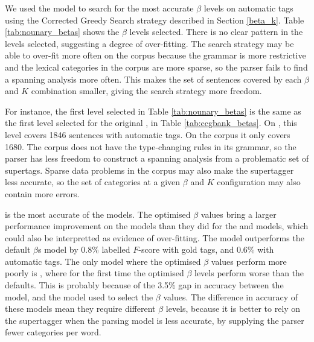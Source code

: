 We used the \hybrid model to search for the most accurate $\beta$ levels on
automatic \pos tags using the Corrected Greedy Search strategy described in
Section \ref{beta_k}. Table \ref{tab:nounary_betas} shows the $\beta$ levels
selected. There is no clear pattern in the levels selected, suggesting a degree
of over-fitting. The search strategy may be able to over-fit more often on the
\nounary corpus because the grammar is more restrictive and the lexical
categories in the corpus are more sparse, so the parser fails to find a spanning
analysis more often. This makes the set of sentences covered by each $\beta$ and $K$
combination smaller, giving the search strategy more freedom. 

For instance, the first level selected in Table \ref{tab:nounary_betas} is the
same as the first level selected for the original \ccgbank, in Table
\ref{tab:ccgbank_betas}. On \ccgbank, this level covers 1846 sentences with
automatic \pos tags. On the \nounary corpus it only covers 1680. The \nounary
corpus does not have the \ccgbank type-changing rules in its grammar, so the
parser has less freedom to construct a spanning analysis from a problematic set
of supertags. Sparse data problems in the corpus may also make the supertagger
less accurate, so the set of categories at a given $\beta$ and $K$ configuration may
also contain more errors.

\hybrid\optbeta is the most accurate of the \nounary models. The optimised
$\beta$ values bring a larger performance improvement on the \nounary models
than they did for the \hatsys and \ccgbank models, which could also be
interpretted as evidence of over-fitting. The \hybrid\optbeta model outperforms
the \hybrid default $\beta$s model by 0.8\% labelled $F$-score with gold \pos
tags, and 0.6\% with automatic \pos tags. The only model where the optimised
$\beta$ values perform more poorly is \derivsbad, where for the first time the
optimised $\beta$ levels perform worse than the defaults. This is probably
because of the 3.5\% gap in accuracy between the \derivsbad model, and the
\hybrid model used to select the $\beta$ values. The difference in accuracy of
these models mean they require different $\beta$ levels, because it is better to
rely on the supertagger when the parsing model is less accurate, by supplying
the parser fewer categories per word.


